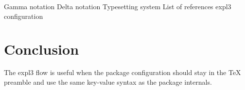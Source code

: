 \documentclass{article}
\begin{document}
\index[notation]{$\gamma$} Gamma notation
\index[notation]{$\delta$} Delta notation
 Typesetting system
 List of references
 expl3 configuration

\section{Conclusion}
\label{sec:conclusion}

The expl3 flow is useful when the package configuration should stay in the TeX
preamble and use the same key-value syntax as the package internals.

\printbibliographymain
\printbibliographyonline

\printindexnotation
\printindex
\end{document}
